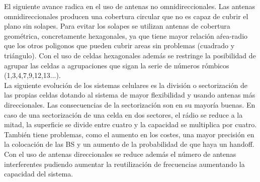 El siguiente avance radica en el uso de antenas no omnidireccionales. Las antenas omnidireccionales producen una cobertura circular que no es capaz de cubrir el plano sin solapes. Para evitar los solapes se utilizan antenas de cobertura geométrica, concretamente hexagonales, ya que tiene mayor relación aŕea-radio que los otros poligonos que pueden cubrir areas sin problemas (cuadrado y triángulo). Con el uso de celdas hexagonales además se restringe la posibilidad de agrupar las celdas a agrupaciones que sigan la serie de números rómbicos (1,3,4,7,9,12,13...).\\
La siguiente evolución de los sistemas celulares es la división o sectorización de las propias celdas dotando al sistema de mayor flexibilidad y usando antenas más direccionales. Las consecuencias de la sectorización son en su mayoría buenas. En caso de una sectorización de una celda en dos sectores, el rádio se reduce a la mitad, la superficie se divide entre cuatro y la capacidad se multiplica por cuatro. También tiene problemas, como el aumento en los costes, una mayor precisión en la colocación de las BS y un aumento de la probabilidad de que haya un handoff. Con el uso de antenas direccionales se reduce además el número de antenas interferentes pudiendo aumentar la reutilización de frecuencias aumentando la capacidad del sistema.
